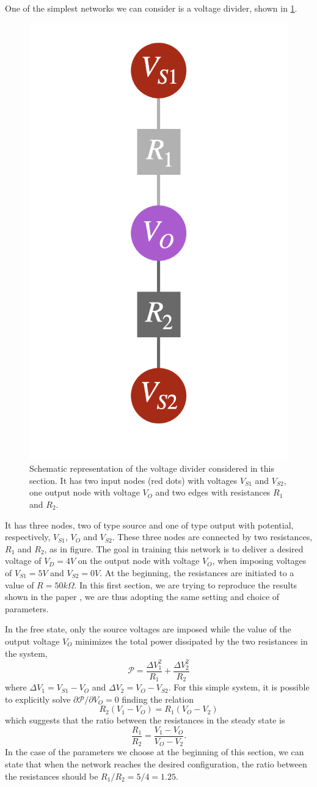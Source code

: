 \documentclass[10.5pt]{article}
\begin{document}
One of the simplest networks we can consider is a voltage divider, shown in \cref{fig:voltage_divider_graph}. 
\begin{figure}[h]
    \centering
    \includegraphics[width=0.2\columnwidth]{../figures_tex/voltage_divider_graph.png}
    \caption{Schematic representation of the voltage divider considered in this section. It has two input nodes (red dots) with voltages $V_{S1}$ and $V_{S2}$, one output node with voltage $V_O$ and two edges with resistances $R_1$ and $R_2$.}
    \label{fig:voltage_divider_graph}
\end{figure} 
It has three nodes, two of type source and one of type output with potential, respectively, $V_{S1}$, $V_{O}$ and $V_{S2}$. These three nodes are connected by two resistances, $R_1$ and $R_2$, as in figure. The goal in training this network is to deliver a desired voltage of $V_{D} = 4V$ on the output node with voltage $V_O$, when imposing voltages of $V_{S1}=5V$ and $V_{S2}=0V$. At the beginning, the resistances are initiated to a value of $R = 50 k \Omega$. In this first section, we are trying to reproduce the results shown in the paper \cite{Dillavou}, we are thus adopting the same setting and choice of parameters.

In the free state, only the source voltages are imposed while the value of the output voltage $V_O$ minimizes the total power dissipated by the two resistances in the system,
\[
\mathcal{P} = \frac{\Delta V_1^2}{R_1} + \frac{\Delta V_2^2}{R_2}
\] 
where $\Delta V_1 = V_{S1} - V_{O}$ and $\Delta V_2 = V_{O} - V_{S2}$. For this simple system, it is possible to explicitly solve $\partial \mathcal{P}/\partial V_O = 0$ finding the relation
\[
R_2 (V_1 - V_O) = R_1 (V_O - V_2)
\]
which suggests that the ratio between the resistances in the steady state is 
\begin{equation}
\frac{R_1}{R_2} = \frac{V_1 - V_O}{V_O - V_2}.
\label{eq:res_ratio_simple}
\end{equation}
In the case of the parameters we choose at the beginning of this section, we can state that when the network reaches the desired configuration, the ratio between the resistances should be $R_1/R_2 = 5/4 = 1.25$.
\end{document}
